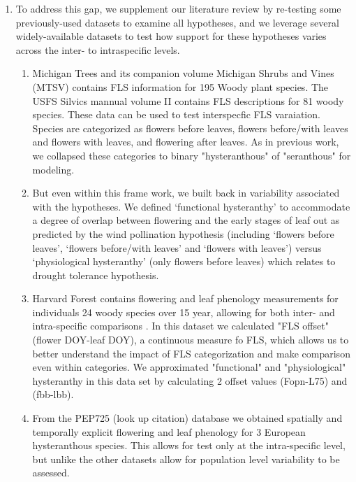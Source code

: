 \documentclass[12pt]{article}\usepackage[]{graphicx}\usepackage[]{color}
\begin{document}
\begin{enumerate}
\item To address this gap, we supplement our literature review by re-testing some previously-used datasets to examine all hypotheses, and we leverage several widely-available datasets to test how support for these hypotheses varies across the inter- to intraspecific levels. %
\begin{enumerate}
\item  Michigan Trees and its companion volume Michigan Shrubs and Vines \citep{Barnes2004,Barnes2016} (MTSV) contains FLS information for 195 Woody plant species. The USFS Silvics mannual volume II \citep{Burns1990} contains FLS descriptions for 81 woody species. These data can be used to test interspecfic FLS varaiation.  Species are categorized as flowers before leaves, flowers before/with leaves and flowers with leaves, and flowering after leaves. As in previous work, we collapsed these categories to binary "hysteranthous" of "seranthous" for modeling. 
\item But even within this frame work, we built back in variability associated with the hypotheses. We defined `functional hysteranthy' to accommodate a degree of overlap between flowering and the early stages of leaf out as predicted by the wind pollination hypothesis (including `flowers before leaves', `flowers before/with leaves' and `flowers with leaves') versus `physiological hysteranthy' (only flowers before leaves) which relates to drought tolerance hypothesis.
\item Harvard Forest contains flowering and leaf phenology measurements for individuals 24 woody species over 15 year, allowing for both inter- and intra-specific comparisons \citep{Okeefe2015}. In this dataset we calculated "FLS offset" (flower DOY-leaf DOY), a continuous measure fo FLS, which allows us to better understand the impact of FLS categorization and make comparison even within categories. We approximated "functional" and "physiological" hysteranthy in this data set by calculating 2 offset values (Fopn-L75) and (fbb-lbb).
\item From the PEP725 (look up citation) database we obtained spatially and temporally explicit flowering and leaf phenology for 3 European hysteranthous species. This allows for test only at the intra-specific level, but unlike the other datasets allow for population level variability to be assessed.
\end{enumerate}
\end{enumerate}
\end{document}
